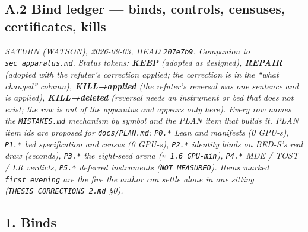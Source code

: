 \documentclass[11pt,a4paper]{article}
\theoremstyle{plain}
\theoremstyle{definition}
\theoremstyle{remark}
\begin{document}
\subsection{A.2 Bind ledger --- binds, controls, censuses, certificates,
kills}\label{a.2-bind-ledger-binds-controls-censuses-certificates-kills}

\emph{SATURN (WATSON), 2026-09-03, HEAD \texttt{207e7b9}. Companion to
\texttt{sec\_apparatus.md}. Status tokens: \textbf{KEEP} (adopted as
designed), \textbf{REPAIR} (adopted with the refuter's correction
applied; the correction is in the ``what changed'' column),
\textbf{KILL→applied} (the refuter's reversal was one sentence and is
applied), \textbf{KILL→deleted} (reversal needs an instrument or bed
that does not exist; the row is out of the apparatus and appears only
here). Every row names the \texttt{MISTAKES.md} mechanism by symbol and
the PLAN item that builds it. PLAN item ids are proposed for
\texttt{docs/PLAN.md}: \texttt{P0.*} Lean and manifests (0 GPU-s),
\texttt{P1.*} bed specification and census (0 GPU-s), \texttt{P2.*}
identity binds on BED-S's real draw (seconds), \texttt{P3.*} the
eight-seed arena (\texttt{≈\ 1.6\ GPU-min}), \texttt{P4.*} MDE / TOST /
LR verdicts, \texttt{P5.*} deferred instruments
(\texttt{NOT\ MEASURED}). Items marked \texttt{first\ evening} are the
five the author can settle alone in one sitting
(\texttt{THESIS\_CORRECTIONS\_2.md} §0).}

\subsection{1. Binds}\label{binds}
\end{document}
